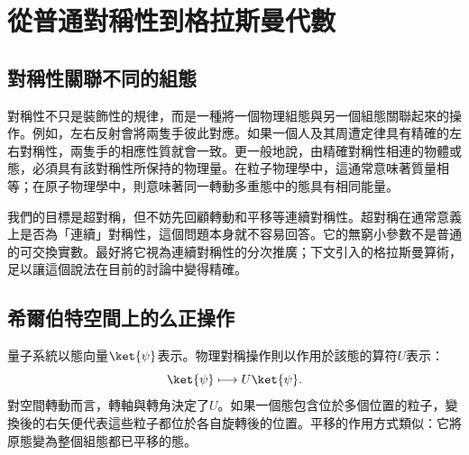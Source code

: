 \chapter{從普通對稱性到格拉斯曼代數}


\section{對稱性關聯不同的組態}

對稱性不只是裝飾性的規律，而是一種將一個物理組態與另一個組態關聯起來的操作。例如，左右反射會將兩隻手彼此對應。如果一個人及其周遭定律具有精確的左右對稱性，兩隻手的相應性質就會一致。更一般地說，由精確對稱性相連的物體或態，必須具有該對稱性所保持的物理量。在粒子物理學中，這通常意味著質量相等；在原子物理學中，則意味著同一轉動多重態中的態具有相同能量。

我們的目標是超對稱，但不妨先回顧轉動和平移等連續對稱性。超對稱在通常意義上是否為「連續」對稱性，這個問題本身就不容易回答。它的無窮小參數不是普通的可交換實數。最好將它視為連續對稱性的分次推廣；下文引入的格拉斯曼算術，足以讓這個說法在目前的討論中變得精確。

\section{希爾伯特空間上的么正操作}

量子系統以態向量\(\ket{\psi}\)表示。物理對稱操作則以作用於該態的算符\(U\)表示：
\begin{equation}
\ket{\psi}\longmapsto U\ket{\psi}.
\end{equation}
對空間轉動而言，轉軸與轉角決定了\(U\)。如果一個態包含位於多個位置的粒子，變換後的右矢便代表這些粒子都位於各自旋轉後的位置。平移的作用方式類似：它將原態變為整個組態都已平移的態。

\begin{classroomqa}
\end{classroomqa}

